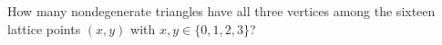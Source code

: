 How many nondegenerate triangles have all three vertices among the sixteen lattice points $(x,y)$ with $x,y\in\{0,1,2,3\}$?
